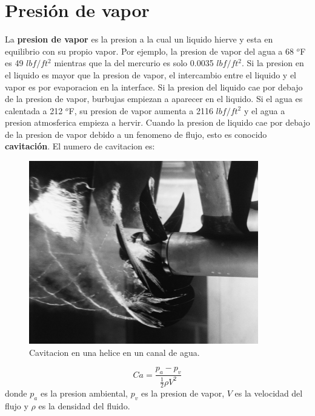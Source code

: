 \documentclass[10pt, oneside]{article}
\begin{document}
\section{Presi\'on de vapor}
La \textbf{presion de vapor} es la presion a la cual un liquido hierve y esta en equilibrio con su propio vapor. Por ejemplo, la presion de vapor del agua a 68 $^o$F es 49 $lbf/ft^2$ mientras que la del mercurio es solo 0.0035 $lbf/ft^2$. Si la presion en el liquido es mayor que la presion de vapor, el intercambio entre el liquido y el vapor es por evaporacion en la interface. Si la presion del liquido cae por debajo de la presion de vapor, burbujas empiezan a aparecer en el liquido. Si el agua es calentada a 212 $^o$F, su presion de vapor aumenta a 2116 $lbf/ft^2$ y el agua a presion atmosferica empieza a hervir. Cuando la presion de liquido cae por debajo de la presion de vapor debido a un fenomeno de flujo, esto es conocido \textbf{cavitaci\'on}. El numero de cavitacion es:

\begin{figure}[h]
\centering
\includegraphics[width=10cm]{Cavitating-prop}
\caption{Cavitacion en una helice en un canal de agua.}
\label{cavi}
\end{figure}

\begin{equation}
Ca = \frac{p_a - p_v}{\frac{1}{2}\rho V^2}
\label{can}
\end{equation}
donde $p_a$ es la presion ambiental, $p_v$ es la presion de vapor, $V$ es la velocidad del flujo y $\rho$ es la densidad del fluido.
\end{document}

